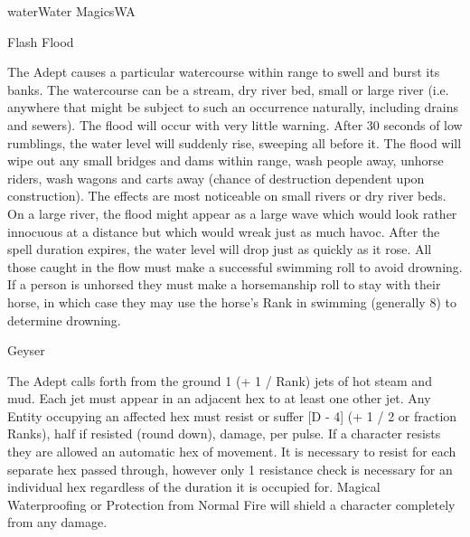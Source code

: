\begin{College}[1.3]{water}{Water Magics}{WA}
\begin{spell}[S-3]{Flash Flood}
\begin{effects}
The Adept causes a particular watercourse within range to swell and
burst its banks.  The watercourse can be a stream, dry river bed,
small or large river (i.e.  anywhere that might be subject to such an
occurrence naturally, including drains and sewers).  The flood will
occur with very little warning.  After 30 seconds of low rumblings,
the water level will suddenly rise, sweeping all before it.  The flood
will wipe out any small bridges and dams within range, wash people
away, unhorse riders, wash wagons and carts away (chance of
destruction dependent upon construction).  The effects are most
noticeable on small rivers or dry river beds. On a large river, the
flood might appear as a large wave which would look rather innocuous
at a distance but which would wreak just as much havoc.  After the
spell duration expires, the water level will drop just as quickly as
it rose.  All those caught in the flow must make a successful swimming
roll to avoid drowning.  If a person is unhorsed they must make a
horsemanship roll to stay with their horse, in which case they may use
the horse’s Rank in swimming (generally 8) to determine drowning.
\end{effects}
\end{spell}

\begin{spell}[S-4]{Geyser}

\begin{effects}
The Adept calls forth from the ground 1 (+ 1 / Rank) jets of hot steam
and mud. Each jet must appear in an adjacent hex to at least one other
jet.  Any Entity occupying an affected hex must resist or suffer [D -
  4] (+ 1 / 2 or fraction Ranks), half if resisted (round down),
damage, per pulse.  If a character resists they are allowed an
automatic hex of movement.  It is necessary to resist for each
separate hex passed through, however only 1 resistance check is
necessary for an individual hex regardless of the duration it is
occupied for. Magical Waterproofing or Protection from Normal Fire
will shield a character completely from any damage.
\end{effects}
\end{spell}


\end{College}
